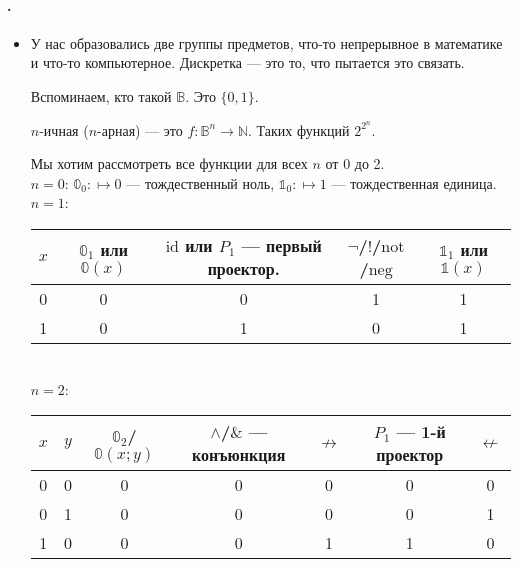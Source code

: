 \documentclass{article}
\begin{document}
    \paragraph{.}
    \begin{itemize}
        \item[]\mbox{}
        \begin{Comment}
            У нас образовались две группы предметов, что-то непрерывное в математике и что-то компьютерное. Дискретка --- это то, что пытается это связать.
        \end{Comment}
        \begin{Comment}
            Вспоминаем, кто такой $\mathbb B$. Это $\{0,1\}$.
        \end{Comment}
        \dfn $n$-ичная ($n$-арная)  --- это $f\colon\mathbb B^n\to\mathbb N$.
        \thm Таких функций $2^{2^n}$.
        \begin{Comment}
            Мы хотим рассмотреть все функции для всех $n$ от 0 до 2.\\
            $n=0$:
            $\mathbb0_0\colon{}\mapsto0$ --- тождественный ноль,
            $\mathbb1_0\colon{}\mapsto1$ --- тождественная единица.\\
            $n=1$:\\
            \begin{tabular}{|c|cccc|}
                \hline
                $x$ & $\mathbb0_1$ или $\mathbb0(x)$ & $\mathrm{id}$ или $P_1$ --- первый проектор. & $\neg$/$!$/$\mathrm{not}$/$\mathrm{neg}$ & $\mathbb1_1$ или $\mathbb1(x)$\\
                \hline
                0 & 0 & 0 & 1 & 1\\
                1 & 0 & 1 & 0 & 1\\
                \hline
            \end{tabular}\\
            $n=2$:\\
            \begin{tabular}{|cc|ccccc|}
                \hline
                $x$ & $y$ & $\mathbb0_2$/$\mathbb0(x;y)$ & $\land$/$\&$ --- конъюнкция & $\not\rightarrow$ & $P_1$ --- 1-й проектор & $\not\leftarrow$\\
                \hline
                0 & 0 & 0 & 0 & 0 & 0 & 0\\
                0 & 1 & 0 & 0 & 0 & 0 & 1\\
                1 & 0 & 0 & 0 & 1 & 1 & 0\\

\end{tabular}
\end{Comment}
\end{itemize}
\end{document}
